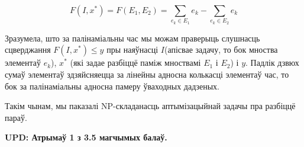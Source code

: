 \documentclass{article}
\begin{document}
\[
F(I, x^{*}) = F(E_1, E_2) = \sum_{e_k \in E_1}{e_k} - \sum_{e_k \in E_2}{e_k}
\]

Зразумела, што за палінаміальны час мы можам праверыць слушнасць сцверджання
$F(I, x^{*}) \leq y$ пры наяўнасці $I$(апісвае задачу, то бок мноства элементаў
$e_k$), $x^{*}$ (які задае разбіццё паміж мноствамі $E_1$ і $E_2$) і $y$. Падлік
дзвюх сумаў элементаў здзяйсняецца за лінейны адносна колькасці элементаў час,
то бок за палінаміальны адносна памеру ўваходных дадзеных.

Такім чынам, мы паказалі NP-складанасць аптымізацыйнай задачы пра разбіццё параў.

\vspace{10mm}

{\color{red} \textbf{UPD: Атрымаў 1 з 3.5 магчымых балаў.} }
\end{document}

